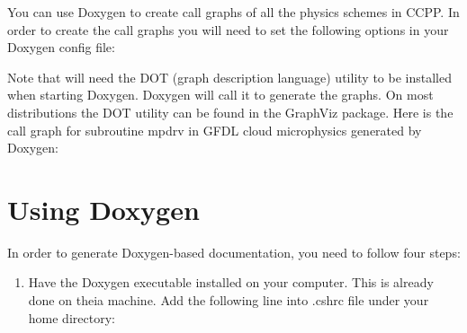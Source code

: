 \documentclass[letterpaper,10pt,english]{sphinxmanual}
\begin{document}
You can use Doxygen to create call graphs of all the physics schemes in CCPP.
In order to create the call graphs you will need to set the following options in
your Doxygen config file:

\begin{sphinxVerbatim}[commandchars=\\\{\}]
\end{sphinxVerbatim}

Note that will need the DOT (graph description language) utility to be installed
when starting Doxygen. Doxygen will call it to generate the graphs. On most
distributions the DOT utility can be found in the GraphViz package. Here is
the call graph for subroutine mpdrv in GFDL cloud microphysics generated by Doxygen:

\begin{figure}[htbp]
\centering

\noindent{}
\end{figure}


\section{Using Doxygen}
\label{\detokenize{ScientificDocRules:using-doxygen}}
In order to generate Doxygen-based documentation, you need to follow four steps:
\begin{enumerate}
\def\theenumi{\arabic{enumi}}
\def\labelenumi{\theenumi .}
\makeatletter\def\p@enumii{\p@enumi \theenumi .}\makeatother
\item {} 
Have the Doxygen executable installed on your computer. This is already done on
theia machine. Add the following line into .cshrc file under your home directory:


\end{enumerate}
\end{document}
